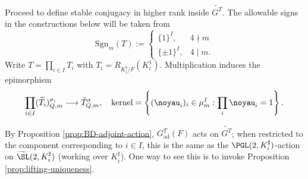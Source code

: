 \documentclass[a4paper,10pt]{article}
\begin{document}
Proceed to define stable conjugacy in higher rank inside $\widetilde{G^T}$. The allowable signs in the constructions below will be taken from 
\begin{equation}\label{eqn:Sgn} \text{Sgn}_m(T) := \begin{cases}
	\{1\}^I, & 4 \nmid m \\
	\{\pm 1\}^I, & 4 \mid m.
\end{cases}\end{equation}
Write $T = \prod_{i \in I} T_i$ with $T_i = R_{K_i^\sharp/F}(K_i^1)$. Multiplication induces the epimorphism
\begin{equation}\label{eqn:T-Q-m-contracted}
	\prod_{i \in I} (\widetilde{T_i})_{Q,m}^{\sigma_i} \longrightarrow \tilde{T}^\sigma_{Q,m}, \quad \text{kernel} = \left\{ (\noyau_i)_i \in \mu_m^I: \prod_i \noyau_i = 1 \right\}.
\end{equation}

\begin{remark}
	By Proposition \ref{prop:BD-adjoint-action}, $G^T_\text{ad}(F)$ acts on $\widetilde{G^T}$; when restricted to the component corresponding to $i \in I$, this is the same as the $\PGL(2, K_i^\sharp)$-action on $\widetilde{\SL}(2, K_i^\sharp)$ (working over $K_i^\sharp$). One way to see this is to invoke Proposition \ref{prop:lifting-uniqueness}.
\end{remark}
\end{document}
